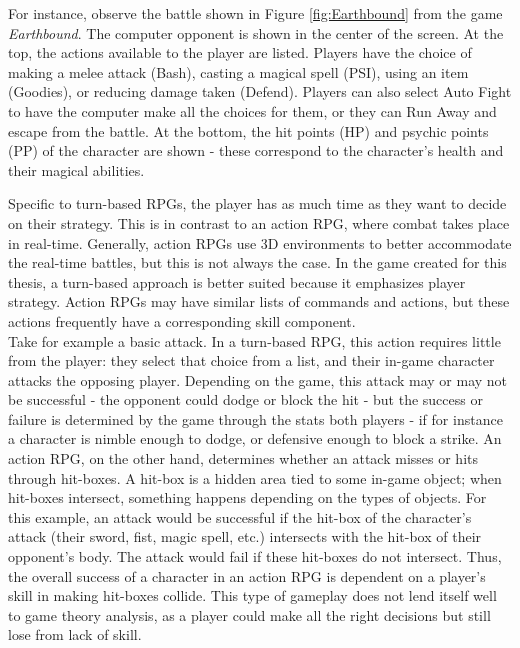 For instance, observe the battle shown in Figure \ref{fig:Earthbound} from the game \textit{Earthbound}. The computer opponent is shown in the center of the screen. At the top, the actions available to the player are listed. Players have the choice of making a melee attack (Bash), casting a magical spell (PSI), using an item (Goodies), or reducing damage taken (Defend). Players can also select Auto Fight to have the computer make all the choices for them, or they can Run Away and escape from the battle. At the bottom, the hit points (HP) and psychic points (PP) of the character are shown - these correspond to the character's health and their magical abilities.

Specific to turn-based RPGs, the player has as much time as they want to decide on their strategy. This is in contrast to an action RPG, where combat takes place in real-time. Generally, action RPGs use 3D environments to better accommodate the real-time battles, but this is not always the case. In the game created for this thesis, a turn-based approach is better suited because it emphasizes player strategy. Action RPGs may have similar lists of commands and actions, but these actions frequently have a corresponding skill component.\\

Take for example a basic attack. In a turn-based RPG, this action requires little from the player: they select that choice from a list, and their in-game character attacks the opposing player. Depending on the game, this attack may or may not be successful - the opponent could dodge or block the hit - but the success or failure is determined by the game through the stats both players - if for instance a character is nimble enough to dodge, or defensive enough to block a strike. An action RPG, on the other hand, determines whether an attack misses or hits through hit-boxes. A hit-box is a hidden area tied to some in-game object; when hit-boxes intersect, something happens depending on the types of objects. For this example, an attack would be successful if the hit-box of the character's attack (their sword, fist, magic spell, etc.) intersects with the hit-box of their opponent's body. The attack would fail if these hit-boxes do not intersect. Thus, the overall success of a character in an action RPG is dependent on a player's skill in making hit-boxes collide. This type of gameplay does not lend itself well to game theory analysis, as a player could make all the right decisions but still lose from lack of skill.\\

